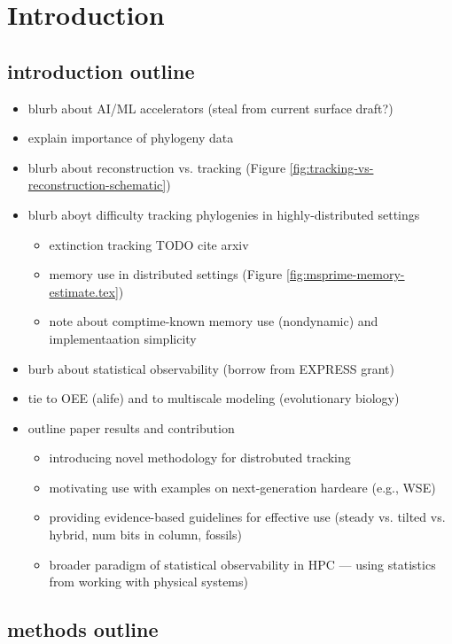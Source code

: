 \section{Introduction} \label{sec:introduction}

\subsection{introduction outline}

\begin{itemize}
\item blurb about AI/ML accelerators (steal from current surface draft?)
\item explain importance of phylogeny data
\item blurb about reconstruction vs. tracking (Figure \ref{fig:tracking-vs-reconstruction-schematic})
\item blurb aboyt difficulty tracking phylogenies in highly-distributed settings
   \begin{itemize}
   \item extinction tracking TODO cite arxiv
   \item memory use in distributed settings (Figure \ref{fig:msprime-memory-estimate.tex})
   \item note about comptime-known memory use (nondynamic) and implementaation simplicity
   \end{itemize}
\item burb about statistical observability (borrow from EXPRESS grant)
\item tie to OEE (alife) and to multiscale modeling (evolutionary biology)
\item outline paper results and contribution
   \begin{itemize}
   \item introducing novel methodology for distrobuted tracking
   \item motivating use with examples on next-generation hardeare (e.g., WSE)
   \item providing evidence-based guidelines for effective use (steady vs. tilted vs. hybrid, num bits in column, fossils)
   \item broader paradigm of statistical observability in HPC --- using statistics from working with physical systems)
   \end{itemize}
\end{itemize}

\subsection{methods outline}

